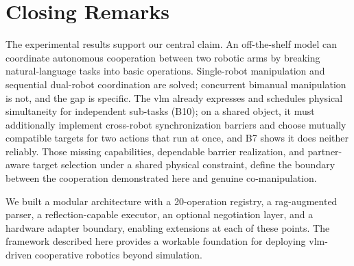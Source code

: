 \section{Closing Remarks}
The experimental results support our central claim. An off-the-shelf model can coordinate autonomous cooperation between two robotic arms by breaking natural-language tasks into basic operations. Single-robot manipulation and sequential dual-robot coordination are solved; concurrent bimanual manipulation is not, and the gap is specific. The \gls{vlm} already expresses and schedules physical simultaneity for independent sub-tasks (B10); on a shared object, it must additionally implement cross-robot synchronization barriers and choose mutually compatible targets for two actions that run at once, and B7 shows it does neither reliably. Those missing capabilities, dependable barrier realization, and partner-aware target selection under a shared physical constraint, define the boundary between the cooperation demonstrated here and genuine co-manipulation.

We built a modular architecture with a 20-operation registry, a \gls{rag}-augmented parser, a reflection-capable executor, an optional negotiation layer, and a hardware adapter boundary, enabling extensions at each of these points. The framework described here provides a workable foundation for deploying \gls{vlm}-driven cooperative robotics beyond simulation.

